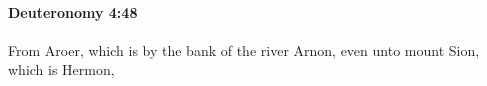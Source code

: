 
		\paragraph{Deuteronomy 4:48} %
			\label{DEUTERONOMY-4-48}

			From Aroer, which is by the bank of the river Arnon, even unto mount Sion, which is Hermon,



